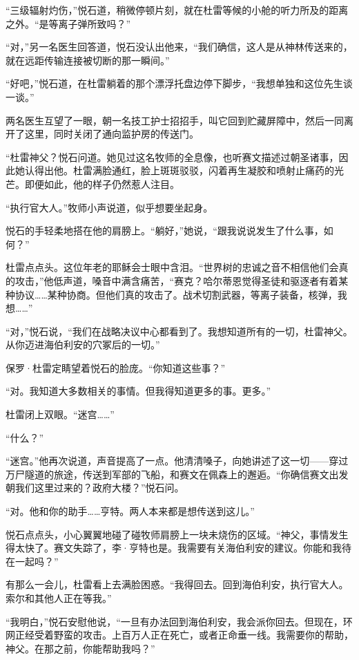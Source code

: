 \documentclass[AutoFakeBold=true]{book}
\begin{document}
``三级辐射灼伤，''悦石道，稍微停顿片刻，就在杜雷等候的小舱的听力所及的距离之外。``是等离子弹所致吗？''

``对，''另一名医生回答道，悦石没认出他来，``我们确信，这人是从神林传送来的，就在远距传输连接被切断的那一瞬间。''

``好吧，''悦石道，在杜雷躺着的那个漂浮托盘边停下脚步，``我想单独和这位先生谈一谈。''

两名医生互望了一眼，朝一名技工护士招招手，叫它回到贮藏屏障中，然后一同离开了这里，同时关闭了通向监护房的传送门。

``杜雷神父？悦石问道。她见过这名牧师的全息像，也听赛文描述过朝圣诸事，因此她认得出他。杜雷满脸通红，脸上斑斑驳驳，闪着再生凝胶和喷射止痛药的光芒。即便如此，他的样子仍然惹人注目。

``执行官大人。''牧师小声说道，似乎想要坐起身。

悦石的手轻柔地搭在他的肩膀上。``躺好，''她说，``跟我说说发生了什么事，如何？''

杜雷点点头。这位年老的耶稣会士眼中含泪。``世界树的忠诚之音不相信他们会真的攻击，''他低声道，嗓音中满含痛苦，``赛克？哈尔蒂恩觉得圣徒和驱逐者有着某种协议……某种协商。但他们真的攻击了。战术切割武器，等离子装备，核弹，我想……''

``对，''悦石说，``我们在战略决议中心都看到了。我想知道所有的一切，杜雷神父。从你迈进海伯利安的穴冢后的一切。''

保罗·杜雷定睛望着悦石的脸庞。``你知道这些事？''

``对。我知道大多数相关的事情。但我得知道更多的事。更多。''

杜雷闭上双眼。``迷宫……''

``什么？''

``迷宫。''他再次说道，声音提高了一点。他清清嗓子，向她讲述了这一切——穿过万尸隧道的旅途，传送到军部的飞船，和赛文在佩森上的邂逅。``你确信赛文出发朝我们这里过来的？政府大楼？''悦石问。

``对。他和你的助手……亨特。两人本来都是想传送到这儿。''

悦石点点头，小心翼翼地碰了碰牧师肩膀上一块未烧伤的区域。``神父，事情发生得太快了。赛文失踪了，李·亨特也是。我需要有关海伯利安的建议。你能和我待在一起吗？''

有那么一会儿，杜雷看上去满脸困惑。``我得回去。回到海伯利安，执行官大人。索尔和其他人正在等我。''

``我明白，''悦石安慰他说，``一旦有办法回到海伯利安，我会派你回去。但现在，环网正经受着野蛮的攻击。上百万人正在死亡，或者正命垂一线。我需要你的帮助，神父。在那之前，你能帮助我吗？''
\end{document}
